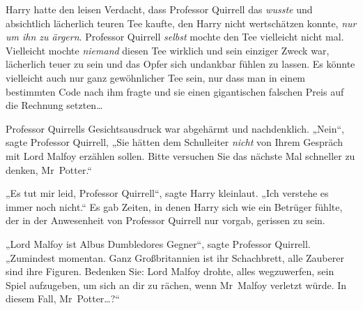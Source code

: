 Harry hatte den leisen Verdacht, dass Professor Quirrell das \emph{wusste} und absichtlich lächerlich teuren Tee kaufte, den Harry nicht wertschätzen konnte, \emph{nur um ihn zu ärgern}. Professor Quirrell \emph{selbst} mochte den Tee vielleicht nicht mal. Vielleicht mochte \emph{niemand} diesen Tee wirklich und sein einziger Zweck war, lächerlich teuer zu sein und das Opfer sich undankbar fühlen zu lassen. Es könnte vielleicht auch nur ganz gewöhnlicher Tee sein, nur dass man in einem bestimmten Code nach ihm fragte und sie einen gigantischen falschen Preis auf die Rechnung setzten…

Professor Quirrells Gesichtsausdruck war abgehärmt und nachdenklich.
„Nein“, sagte Professor Quirrell,
„Sie hätten dem Schulleiter \emph{nicht} von Ihrem Gespräch mit Lord Malfoy erzählen sollen. Bitte versuchen Sie das nächste Mal schneller zu denken, Mr~Potter.“

„Es tut mir leid, Professor Quirrell“, sagte Harry kleinlaut.
„Ich verstehe es immer noch nicht.“ Es gab Zeiten, in denen Harry sich wie ein Betrüger fühlte, der in der Anwesenheit von Professor Quirrell nur vorgab, gerissen zu sein.

„Lord Malfoy ist Albus Dumbledores Gegner“, sagte Professor Quirrell.
„Zumindest momentan. Ganz Großbritannien ist ihr Schachbrett, alle Zauberer sind ihre Figuren. Bedenken Sie: Lord Malfoy drohte, alles wegzuwerfen, sein Spiel aufzugeben, um sich an dir zu rächen, wenn Mr~Malfoy verletzt würde. In diesem Fall, Mr~Potter…?“

